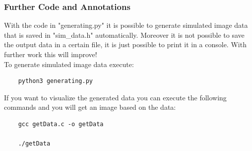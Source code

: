 \documentclass{article}
\begin{document}
{\subsubsection*{Further Code and Annotations}
With the code in "generating.py" it is possible to generate simulated image data that is saved in "sim\_data.h" automatically. Moreover it is not possible to save the output data in a certain file, it is just possible to print it in a console.
With further work this will improve!\\
To generate simulated image data execute:
\begin{verbatim}
    python3 generating.py
\end{verbatim}
If you want to visualize the generated data you can execute the following commands and you will get an image based on the data:
\begin{verbatim}
    gcc getData.c -o getData

    ./getData
\end{verbatim}
 
}
\end{document}
